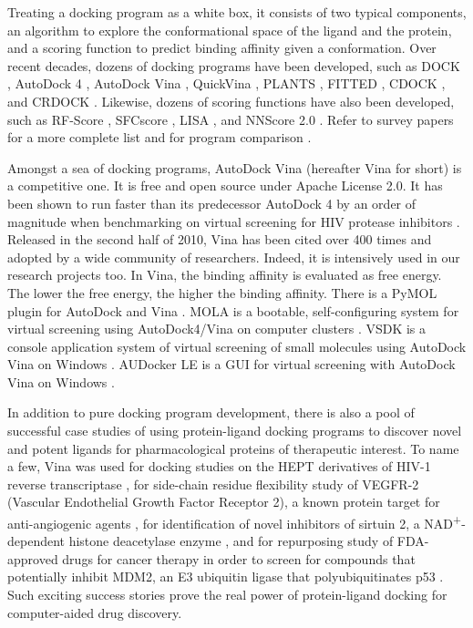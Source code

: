 Treating a docking program as a white box, it consists of two typical components, an algorithm to explore the conformational space of the ligand and the protein, and a scoring function to predict binding affinity given a conformation. Over recent decades, dozens of docking programs have been developed, such as DOCK \citep{1222}, AutoDock 4 \citep{785,596}, AutoDock Vina \citep{595}, QuickVina \citep{1193}, PLANTS \citep{610,607,779}, FITTED \citep{602}, CDOCK \citep{1224}, and CRDOCK \citep{1200}. Likewise, dozens of scoring functions have also been developed, such as RF-Score \citep{564}, SFCscore \citep{581}, LISA \citep{775}, and NNScore 2.0 \citep{977}. Refer to survey papers for a more complete list \citep{493,922} and for program comparison \citep{556,637}.

Amongst a sea of docking programs, AutoDock Vina \citep{595} (hereafter Vina for short) is a competitive one. It is free and open source under Apache License 2.0. It has been shown to run faster than its predecessor AutoDock 4 \citep{596} by an order of magnitude when benchmarking on virtual screening for HIV protease inhibitors \citep{556}. Released in the second half of 2010, Vina has been cited over 400 times and adopted by a wide community of researchers. Indeed, it is intensively used in our research projects too. In Vina, the binding affinity is evaluated as free energy. The lower the free energy, the higher the binding affinity. There is a PyMOL plugin for AutoDock and Vina \citep{609}. MOLA is a bootable, self-configuring system for virtual screening using AutoDock4/Vina on computer clusters \citep{773}. VSDK is a console application system of virtual screening of small molecules using AutoDock Vina on Windows \citep{1268}. AUDocker LE is a GUI for virtual screening with AutoDock Vina on Windows \citep{1250}.

In addition to pure docking program development, there is also a pool of successful case studies of using protein-ligand docking programs to discover novel and potent ligands for pharmacological proteins of therapeutic interest. To name a few, Vina was used for docking studies on the HEPT derivatives of HIV-1 reverse transcriptase \citep{843}, for side-chain residue flexibility study of VEGFR-2 (Vascular Endothelial Growth Factor Receptor 2), a known protein target for anti-angiogenic agents \citep{1084}, for identification of novel inhibitors of sirtuin 2, a NAD\textsuperscript{+}-dependent histone deacetylase enzyme \citep{1177}, and for repurposing study of FDA-approved drugs for cancer therapy in order to screen for compounds that potentially inhibit MDM2, an E3 ubiquitin ligase that polyubiquitinates p53 \citep{1230}. Such exciting success stories prove the real power of protein-ligand docking for computer-aided drug discovery.

